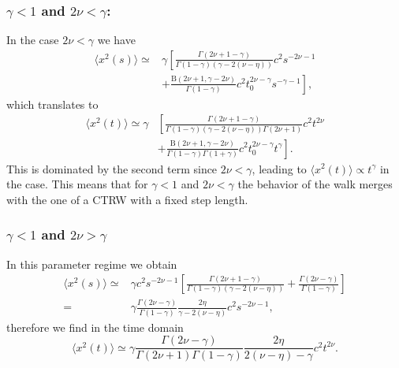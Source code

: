 \subsubsection{$\gamma<1$ and $2\nu < \gamma$: }
In the case  $2\nu < \gamma $ we have
\begin{equation}
\begin{split}
\langle x^2(s) \rangle  \simeq &  \gamma  \left[\frac{\Gamma(2\nu +1-\gamma)}{\Gamma(1-\gamma)(\gamma - 2(\nu-\eta))}c^2 s^{-2\nu -1} \right. \\
& \left. + \frac{\mathrm{B}(2\nu+1,\gamma-2\nu)}{\Gamma(1-\gamma)}c^2 t_0^{2\nu-\gamma} s^{-\gamma -1} \right] , 
\end{split}
\end{equation}
which translates to
\begin{equation}
\begin{split}
 \langle x^2(t) \rangle \simeq \gamma  & \left[\frac{\Gamma(2\nu +1-\gamma)}{\Gamma(1-\gamma)(\gamma-2(\nu-\eta))\Gamma(2\nu + 1)} c^2 t^{2\nu} \right. \\ 
 & \left.  + \frac{\mathrm{B}(2\nu+1,\gamma-2\nu)}{\Gamma(1-\gamma)\Gamma(1+\gamma)} c^2 t_0^{2\nu-\gamma} t^{\gamma} \right].
 \end{split}
\end{equation}
This is dominated by the second term since $2\nu < \gamma$, leading to  $\langle x^2(t) \rangle \propto t^\gamma$ in the case. 
This means that for $\gamma < 1$ and $2\nu < \gamma$ the behavior of the walk merges with the one of a CTRW
with a fixed step length.



\subsubsection{$\gamma<1$ and  $2\nu > \gamma$ }
In this parameter regime we obtain
\begin{align}
 \langle x^2(s) \rangle \simeq & \gamma c^2 s^{-2\nu-1}  \left[\frac{\Gamma(2\nu+1-\gamma)}{\Gamma(1-\gamma)(\gamma - 2(\nu-\eta))} +  \frac{\Gamma(2\nu-\gamma)}{\Gamma(1-\gamma)} \right]  \nonumber \\
 = & \gamma  \frac{\Gamma(2\nu -\gamma)}{\Gamma(1-\gamma)} \frac{2\eta }{\gamma - 2(\nu-\eta)}c^2  s^{-2\nu-1} ,
\end{align}
therefore we find in the time domain
\begin{equation}
 \langle x^2(t) \rangle \simeq \gamma \frac{\Gamma(2\nu -\gamma)} {\Gamma(2\nu+1) \Gamma(1-\gamma)} \frac{2\eta}{2(\nu-\eta)-\gamma}  c^2  t^{2\nu} .
\end{equation}

